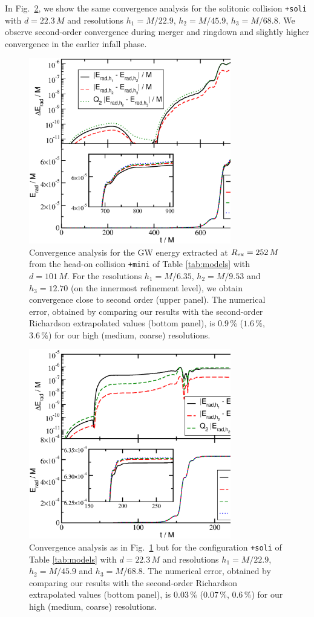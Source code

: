 \documentclass[]{iopart}
\begin{document}
In Fig.~\ref{fig:conv_tsBS_Erad}, we show the same convergence
analysis for the solitonic collision {\tt +soli} with $d=22.3\,M$
and resolutions $h_1=M/22.9$, $h_2=M/45.9$, $h_3=M/68.8$. We observe
second-order convergence during merger and ringdown and slightly
higher convergence in the earlier infall phase.
%
\begin{figure}[t]
    \centering
    \includegraphics[width=250pt]{conv_tmBS_Erad.eps}
    \caption{
    Convergence analysis for the GW energy extracted at $R_{\rm
    ex}=252\,M$ from the head-on collision {\tt +mini} of Table
    \ref{tab:models} with $d=101\,M$. For the resolutions $h_1=M/6.35$,
    $h_2=M/9.53$ and $h_3=12.70$ (on the innermost refinement level),
    we obtain convergence close to second order (upper panel). The
    numerical error, obtained by comparing our results with the
    second-order Richardson extrapolated values (bottom panel), is
    $0.9\,\%$ ($1.6\,\%$, $3.6\,\%$) for our high (medium, coarse)
    resolutions.
    }
    \label{fig:conv_tmBS_Erad}
\end{figure}
%
%
\begin{figure}[t]
    \centering
    \includegraphics[width=250pt]{conv_tsBS_Erad.eps}
    \caption{
    Convergence analysis as in Fig.~\ref{fig:conv_tmBS_Erad} but
    for the configuration {\tt +soli} of Table \ref{tab:models}
    with $d=22.3\,M$ and resolutions $h_1=M/22.9$, $h_2=M/45.9$ and
    $h_3=M/68.8$.  The numerical error, obtained by comparing our
    results with the second-order Richardson extrapolated values
    (bottom panel), is $0.03\,\%$ ($0.07\,\%$, $0.6\,\%$) for our
    high (medium, coarse) resolutions.
    }
    \label{fig:conv_tsBS_Erad}
\end{figure}
\end{document}
